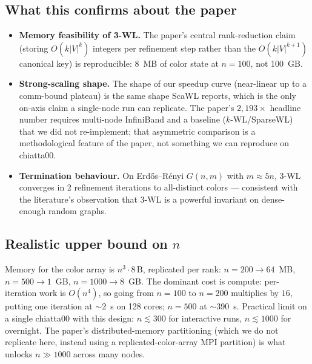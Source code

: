 \documentclass[11pt]{article}
\begin{document}
\subsection{What this confirms about the paper}
\begin{itemize}[leftmargin=1.5em,itemsep=2pt]
  \item \textbf{Memory feasibility of 3-WL.} The paper's central rank-reduction claim (storing $O(k|V|^k)$ integers per refinement step rather than the $O(k|V|^{k+1})$ canonical key) is reproducible: 8~MB of color state at $n{=}100$, not 100~GB.
  \item \textbf{Strong-scaling shape.} The shape of our speedup curve (near-linear up to a comm-bound plateau) is the same shape ScaWL reports, which is the only on-axis claim a single-node run can replicate. The paper's $2{,}193\times$ headline number requires multi-node InfiniBand and a baseline ($k$-WL/SparseWL) that we did not re-implement; that asymmetric comparison is a methodological feature of the paper, not something we can reproduce on chiatta00.
  \item \textbf{Termination behaviour.} On Erd\H{o}s--R\'enyi $G(n,m)$ with $m \approx 5n$, 3-WL converges in 2 refinement iterations to all-distinct colors --- consistent with the literature's observation that 3-WL is a powerful invariant on dense-enough random graphs.
\end{itemize}

\subsection{Realistic upper bound on $n$}
Memory for the color array is $n^3 \cdot 8\,\mathrm{B}$, replicated per rank: $n{=}200 \to 64$~MB, $n{=}500 \to 1$~GB, $n{=}1000 \to 8$~GB. The dominant cost is compute: per-iteration work is $O(n^4)$, so going from $n{=}100$ to $n{=}200$ multiplies by $16$, putting one iteration at $\sim$2~s on 128 cores; $n{=}500$ at $\sim$390~s. Practical limit on a single chiatta00 with this design: $n \lesssim 300$ for interactive runs, $n \lesssim 1000$ for overnight. The paper's distributed-memory partitioning (which we do not replicate here, instead using a replicated-color-array MPI partition) is what unlocks $n \gg 1000$ across many nodes.
\end{document}
